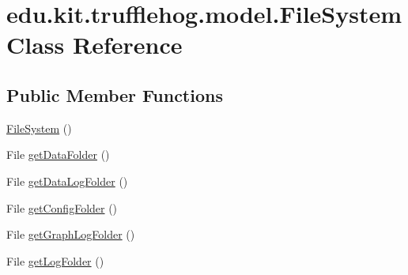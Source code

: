 \hypertarget{classedu_1_1kit_1_1trufflehog_1_1model_1_1_file_system}{}\section{edu.\+kit.\+trufflehog.\+model.\+File\+System Class Reference}
\label{classedu_1_1kit_1_1trufflehog_1_1model_1_1_file_system}
\subsection*{Public Member Functions}
\begin{DoxyCompactItemize}
\item 
\hyperlink{classedu_1_1kit_1_1trufflehog_1_1model_1_1_file_system_adbc995de33c1ac9171e424abaa8d69d8}{File\+System} ()
\item 
File \hyperlink{classedu_1_1kit_1_1trufflehog_1_1model_1_1_file_system_af99824871df77f3caa54231bfc6d1195}{get\+Data\+Folder} ()
\item 
File \hyperlink{classedu_1_1kit_1_1trufflehog_1_1model_1_1_file_system_a5f5c82767a27fb361fbfc41f160f14b7}{get\+Data\+Log\+Folder} ()
\item 
File \hyperlink{classedu_1_1kit_1_1trufflehog_1_1model_1_1_file_system_a79727e770c2813a6e1e9653f79d83094}{get\+Config\+Folder} ()
\item 
File \hyperlink{classedu_1_1kit_1_1trufflehog_1_1model_1_1_file_system_afd39b43c19f095b6d25c7846fbf45742}{get\+Graph\+Log\+Folder} ()
\item 
File \hyperlink{classedu_1_1kit_1_1trufflehog_1_1model_1_1_file_system_a423b2e19eb7dc0c6cb499604b1f44f12}{get\+Log\+Folder} ()
\end{DoxyCompactItemize}



